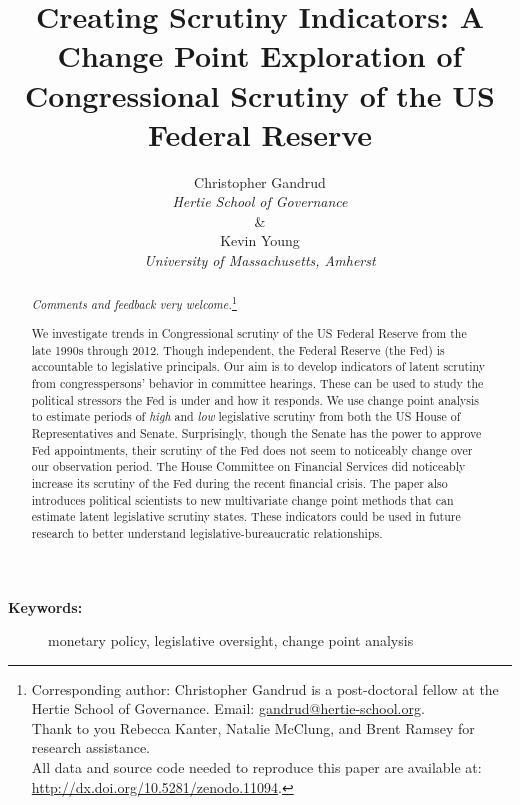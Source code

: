 \documentclass[a4paper]{article}\usepackage[]{graphicx}\usepackage[]{color}
\title{Creating Scrutiny Indicators: A Change Point Exploration of Congressional Scrutiny of the US Federal Reserve}
\author{Christopher Gandrud \\ {\emph{Hertie School of Governance}} \\ \& \\ Kevin Young \\ {\emph{University of Massachusetts, Amherst}}}
\begin{document}
\maketitle

\begin{abstract}

\noindent\emph{Comments and feedback very welcome.}\footnote{Corresponding author: Christopher Gandrud is a post-doctoral fellow at the Hertie School of Governance. Email: \href{mailto:gandrud@hertie-school.org}{gandrud@hertie-school.org}. \\ Thank to you Rebecca Kanter, Natalie McClung, and Brent Ramsey for research assistance. \\
All data and source code needed to reproduce this paper are available at: \url{http://dx.doi.org/10.5281/zenodo.11094}.}

We investigate trends in Congressional scrutiny of the US Federal Reserve from the late 1990s through 2012. Though independent, the Federal Reserve (the Fed) is accountable to legislative principals. Our aim is to develop indicators of latent scrutiny from congresspersons' behavior in committee hearings. These can be used to study the political stressors the Fed is under and how it responds. We use change point analysis to estimate periods of \emph{high} and \emph{low} legislative scrutiny from both the US House of Representatives and Senate. Surprisingly, though the Senate has the power to approve Fed appointments, their scrutiny of the Fed does not seem to noticeably change over our observation period. The House Committee on Financial Services did noticeably increase its scrutiny of the Fed during the recent financial crisis. The paper also introduces political scientists to new multivariate change point methods that can estimate latent legislative scrutiny states. These indicators could be used in future research to better understand legislative-bureaucratic relationships.

\end{abstract}

\begin{description}
  \item [{\textbf{Keywords:}}] monetary policy, legislative oversight, change point analysis
\end{description}
\end{document}
